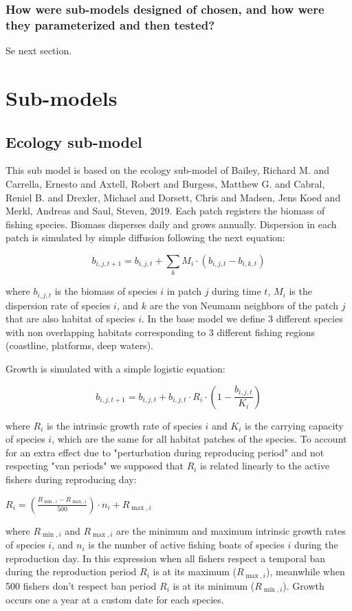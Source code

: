 \documentclass[11pt]{article}
\begin{document}
\subsubsection{How were sub-models designed of chosen, and how were they parameterized and then tested?}
\label{sec:org06a845a}
Se next section.
\section{Sub-models}
\label{sec:orgfc7b539}
\subsection{Ecology sub-model}
\label{sec:org35e64be}

This sub model is based on the ecology sub-model of Bailey, Richard M. and Carrella, Ernesto and Axtell, Robert and Burgess, Matthew G. and Cabral, Reniel B. and Drexler, Michael and Dorsett, Chris and Madsen, Jens Koed and Merkl, Andreas and Saul, Steven, 2019. Each patch registers the biomass of fishing species. Biomass disperses daily and grows annually. Dispersion in each patch is simulated by simple diffusion following the next equation:

\[ b_{i,j,t+1} =   b_{i,j,t} +  \sum_k M_i \cdot (b_{i,j,t} - b_{i,k,t}) \]

where \(b_{i,j,t}\) is the biomass of species \(i\) in patch \(j\) during time \(t\), \(M_i\) is the dispersion rate of species \(i\), and \(k\) are the von Neumann neighbors of the patch \(j\) that are also habitat of species \(i\). In the base model we define 3 different species with non overlapping habitats corresponding to 3 different fishing regions (coastline, platforms, deep waters).

Growth is simulated with a simple logistic equation:

\[ b_{i,j,t+1} = b_{i,j,t} + b_{i,j,t} \cdot R_i \cdot \left( 1 - \frac{b_{i,j,t}}{K_i} \right)  \]

where \(R_i\) is the intrinsic growth rate of species \(i\) and \(K_i\) is the carrying capacity of species \(i\), which are the same for all habitat patches of the species. To account for an extra effect due to "perturbation during reproducing period" and not respecting "van periods" we supposed that \(R_i\) is related linearly to the active fishers during reproducing day:

\(R_i = (\frac{R_{\min,i} - R_{\max,i}}{500}) \cdot n_i + R_{\max, i}\)

where \(R_{\min, i}\) and \(R_{\max, i}\) are the minimum and maximum intrinsic growth rates of species \(i\), and  \(n_i\) is the number of active fishing boats of species \(i\) during the reproduction day. In this expression when all fishers respect a temporal ban during the reproduction period \(R_i\) is at its maximum (\(R_{\max,i}\)), meanwhile when 500 fishers don't respect ban period \(R_i\) is at its minimum (\(R_{\min,i}\)). Growth occurs one a year at a custom date for each species. 
\end{document}
